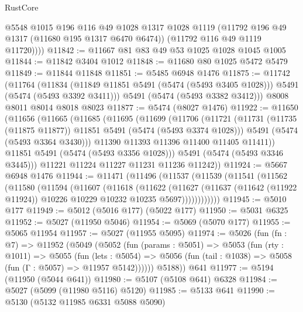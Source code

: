 \begin{lexlean}{RustCore}
\begin{coremodule}
          @5548
          @1015
          @196
          @116
          @49
          @1028
          @1317
          @1028
          @1119
          (@11792 @196 @49 @1317 (@11680 @195 @1317 @6470 @6474))
          (@11792 @116 @49 @1119 @11720))))
@11842 := @11667 @81 @83 @49 @53 @1025 @1028 @1045 @1005
@11844 := @11842 @3404 @1012
@11848 := @11680 @80 @1025 @5472 @5479
@11849 := @11844 @11848
@11851 := @5485 @6948 @1476
@11875 := @11742
    (@11764
      (@11834 (@11849 @11851 @5491 (@5474 (@5493 @3405 @1028))) @5491 (@5474 (@5493 @3392 @3411)))
      @5491
      (@5474 (@5493 @3382 @3412)))
    @8008
    @8011
    @8014
    @8018
    @8023
@11877 := @5474 (@8027 @1476)
@11922 := @11650
    (@11656
      (@11665
        (@11685
          (@11695
            (@11699
              (@11706
                (@11721
                  (@11731 (@11735 (@11875 @11877)) @11851 @5491 (@5474 (@5493 @3374 @1028)))
                  @5491
                  (@5474 (@5493 @3364 @3430)))
                @11390
                @11393
                @11396
                @11400
                @11405
                @11411))
            @11851
            @5491
            (@5474 (@5493 @3356 @1028)))
          @5491
          (@5474 (@5493 @3346 @3445)))
        @11221
        @11224
        @11227
        @11231
        @11236
        @11242))
@11924 := @5667 @6948 @1476
@11944 := @11471
    (@11496
      (@11537
        (@11539
          (@11541
            (@11562
              (@11580
                (@11594
                  (@11607
                    (@11618
                      (@11622
                        (@11627
                          (@11637
                            (@11642 (@11922 @11924))
                            @10226
                            @10229
                            @10232
                            @10235
                            @5697))))))))))))
@11945 := @5010 @177
@11949 := @5012 (@5016 @177) (@5022 @177)
@11950 := @5031 @6325
@11952 := @5027 (@11950 @5046)
@11954 := @5069 (@5070 @177)
@11955 := @5065 @11954
@11957 := @5027 (@11955 @5095)
@11974 := @5026
    (fun (fn : @7) =>
    @11952
      (@5049
        (@5052
          (fun (params : @5051) =>
          @5053
            (fun (rty : @1011) =>
            @5055
              (fun (lets : @5054) =>
              @5056 (fun (tail : @1038) => @5058 (fun (Γ : @5057) => @11957 @5142))))))
        @5188))
    @641
@11977 := @5194 (@11950 (@5044 @641))
@11980 := @5107 (@5108 @641) @6328
@11984 := @5027 (@5099 (@11980 @5116) @5120)
@11985 := @5133 @641
@11990 := @5130 (@5132 @11985 @6331 @5088 @5090)

\end{coremodule}
\end{lexlean}
